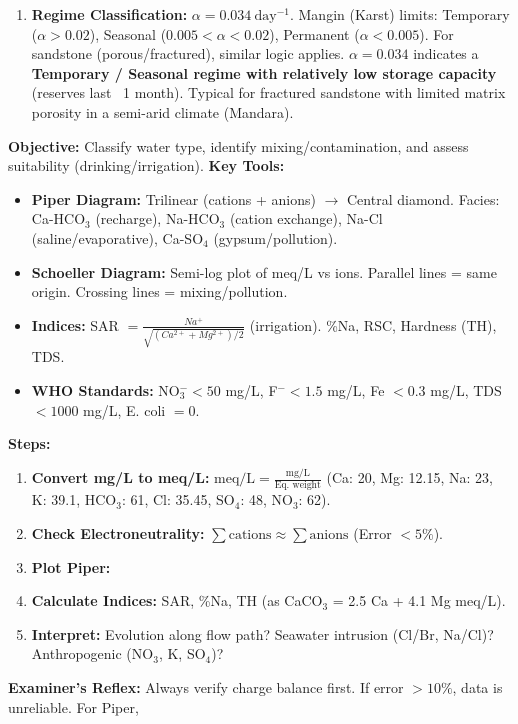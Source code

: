 \documentclass[11pt]{article}
\begin{document}
\begin{exoresolu}
\begin{enumerate}
    Volume drained between $t=0$ and $t=70$:
    \[ V_{0-70} = V_{total} (1 - e^{-\alpha \times 70}) = 304\,000 \times (1 - e^{-2.389}) = 304\,000 \times (1 - 0.092) = \mathbf{276\,000\ \mathrm{m^3}} \]
    (Alternatively: Trapezoidal integration on $Q(t)$ table gives similar result).
    \item \textbf{Regime Classification:}
    $\alpha = 0.034\ \mathrm{day^{-1}}$. Mangin (Karst) limits: Temporary ($\alpha > 0.02$), Seasonal ($0.005 < \alpha < 0.02$), Permanent ($\alpha < 0.005$).
    For sandstone (porous/fractured), similar logic applies. $\alpha = 0.034$ indicates a \textbf{Temporary / Seasonal regime with relatively low storage capacity} (reserves last ~1 month). Typical for fractured sandstone with limited matrix porosity in a semi-arid climate (Mandara).
\end{enumerate}
\end{exoresolu}

\begin{methode}
\textbf{Objective:} Classify water type, identify mixing/contamination, and assess suitability (drinking/irrigation).
\textbf{Key Tools:}
\begin{itemize}
    \item \textbf{Piper Diagram:} Trilinear (cations + anions) $\to$ Central diamond. Facies: Ca-HCO$_3$ (recharge), Na-HCO$_3$ (cation exchange), Na-Cl (saline/evaporative), Ca-SO$_4$ (gypsum/pollution).
    \item \textbf{Schoeller Diagram:} Semi-log plot of meq/L vs ions. Parallel lines = same origin. Crossing lines = mixing/pollution.
    \item \textbf{Indices:} SAR $= \frac{Na^+}{\sqrt{(Ca^{2+}+Mg^{2+})/2}}$ (irrigation). \%Na, RSC, Hardness (TH), TDS.
    \item \textbf{WHO Standards:} NO$_3^- < 50$ mg/L, F$^- < 1.5$ mg/L, Fe $< 0.3$ mg/L, TDS $< 1000$ mg/L, E. coli $= 0$.
\end{itemize}
\textbf{Steps:}
\begin{enumerate}
    \item \textbf{Convert mg/L to meq/L:} $\text{meq/L} = \frac{\text{mg/L}}{\text{Eq. weight}}$ (Ca: 20, Mg: 12.15, Na: 23, K: 39.1, HCO$_3$: 61, Cl: 35.45, SO$_4$: 48, NO$_3$: 62).
    \item \textbf{Check Electroneutrality:} $\sum \text{cations} \approx \sum \text{anions}$ (Error $< 5\%$).
    \item \textbf{Plot Piper:} %
    \item \textbf{Calculate Indices:} SAR, \%Na, TH (as CaCO$_3$ = 2.5 Ca + 4.1 Mg meq/L).
    \item \textbf{Interpret:} Evolution along flow path? Seawater intrusion (Cl/Br, Na/Cl)? Anthropogenic (NO$_3$, K, SO$_4$)?
\end{enumerate}
\textbf{Examiner's Reflex:} Always verify charge balance first. If error $> 10\%$, data is unreliable. For Piper, %
\end{methode}
\end{document}
